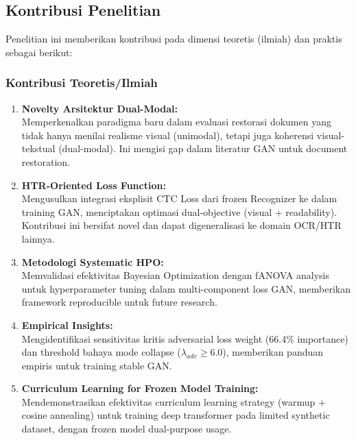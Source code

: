 \documentclass[12pt,a4paper]{article}
\begin{document}
\subsection{Kontribusi Penelitian}
\label{subsec:kontribusi}
\vspace{0.8em}

Penelitian ini memberikan kontribusi pada dimensi teoretis (ilmiah) dan praktis sebagai berikut:

\subsubsection{Kontribusi Teoretis/Ilmiah}

\begin{enumerate}[label=\arabic*., leftmargin=0.5cm]
    \item \textbf{Novelty Arsitektur Dual-Modal:} \\
    Memperkenalkan paradigma baru dalam evaluasi restorasi dokumen yang tidak hanya menilai realisme visual (unimodal), tetapi juga koherensi visual-tekstual (dual-modal). Ini mengisi gap dalam literatur GAN untuk document restoration.
    
    \item \textbf{HTR-Oriented Loss Function:} \\
    Mengusulkan integrasi eksplisit CTC Loss dari frozen Recognizer ke dalam training GAN, menciptakan optimasi dual-objective (visual + readability). Kontribusi ini bersifat novel dan dapat digeneralisasi ke domain OCR/HTR lainnya.
    
    \item \textbf{Metodologi Systematic HPO:} \\
    Memvalidasi efektivitas Bayesian Optimization dengan fANOVA analysis untuk hyperparameter tuning dalam multi-component loss GAN, memberikan framework reproducible untuk future research.
    
    \item \textbf{Empirical Insights:} \\
    Mengidentifikasi sensitivitas kritis adversarial loss weight (66.4\% importance) dan threshold bahaya mode collapse ($\lambda_{adv} \geq 6.0$), memberikan panduan empiris untuk training stable GAN.
    
    \item \textbf{Curriculum Learning for Frozen Model Training:} \\
    Mendemonstrasikan efektivitas curriculum learning strategy (warmup + cosine annealing) untuk training deep transformer pada limited synthetic dataset, dengan frozen model dual-purpose usage.
\end{enumerate}
\end{document}
